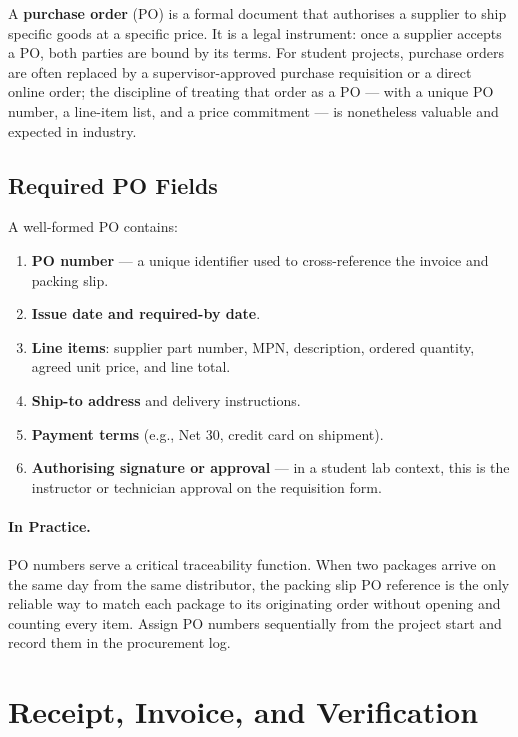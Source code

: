 A \textbf{purchase order} (PO) is a formal document that
authorises a supplier to ship specific goods at a specific price.
It is a legal instrument: once a supplier accepts a PO, both parties are bound
by its terms.
For student projects, purchase orders are often replaced by a supervisor-approved
purchase requisition or a direct online order; the discipline of treating that
order as a PO --- with a unique PO number, a line-item list, and a price
commitment --- is nonetheless valuable and expected in industry.

\subsection{Required PO Fields}
\label{sec:ch11-po-fields}

A well-formed PO contains:

\begin{enumerate}
  \item[(a)] \textbf{PO number} --- a unique identifier used to cross-reference
        the invoice and packing slip.
  \item[(b)] \textbf{Issue date and required-by date}.
  \item[(c)] \textbf{Line items}: supplier part number, MPN, description, ordered
        quantity, agreed unit price, and line total.
  \item[(d)] \textbf{Ship-to address} and delivery instructions.
  \item[(e)] \textbf{Payment terms} (e.g., Net 30, credit card on shipment).
  \item[(f)] \textbf{Authorising signature or approval} --- in a student lab
        context, this is the instructor or technician approval on the
        requisition form.
\end{enumerate}

\paragraph{In Practice.}
PO numbers serve a critical traceability function.
When two packages arrive on the same day from the same distributor, the packing
slip PO reference is the only reliable way to match each package to its
originating order without opening and counting every item.
Assign PO numbers sequentially from the project start and record them in the
procurement log.

\section{Receipt, Invoice, and Verification}
\label{sec:ch11-receipt}

